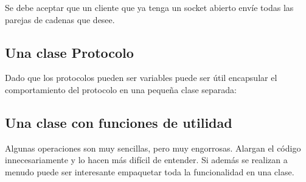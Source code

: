 \documentclass[letterpaper,10pt,spanish]{sphinxmanual}
\begin{document}
Se debe aceptar que un cliente que ya tenga un socket abierto envíe todas las parejas de cadenas que desee.


\subsection{Una clase Protocolo}
\label{\detokenize{textos/tema3:una-clase-protocolo}}
Dado que los protocolos pueden ser variables puede ser útil encapsular el comportamiento del protocolo en una pequeña clase separada:

\begin{sphinxVerbatim}[commandchars=\\\{\}]
   
           
           
                 
                 
           
                 
                 
           
                 
\end{sphinxVerbatim}


\subsection{Una clase con funciones de utilidad}
\label{\detokenize{textos/tema3:una-clase-con-funciones-de-utilidad}}
Algunas operaciones son muy sencillas, pero muy engorrosas. Alargan el código innecesariamente y lo hacen más difícil de entender. Si además se realizan a menudo puede ser interesante empaquetar toda la funcionalidad en una clase.
\end{document}
